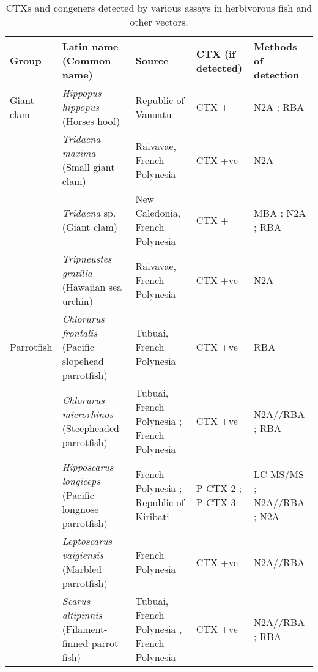 \documentclass[12pt]{article}
\begin{document}
\FloatBarrier
\begin{longtable}[l]{ | p{2cm} | p{3cm} | p{4.5cm} | p{2cm} | p{3cm} | }
	\caption{CTXs and congeners detected by various assays in herbivorous fish and other vectors.}\\
	\hline
	\label{tbl:HerbTable}
	\textbf{Group} & \textbf{Latin name} (Common name) & \textbf{Source} & \textbf{CTX (if detected)} & \textbf{Methods of detection} \\
	\hline
	Giant clam 	& \emph{Hippopus hippopus} (Horses hoof) & Republic of Vanuatu \cite{laurent2012ciguatera} & CTX +\cite{laurent2012ciguatera} & N2A \cite{laurent2012ciguatera}; RBA \cite{laurent2012ciguatera} \\
	& \emph{Tridacna maxima} (Small giant clam) & Raivavae, French Polynesia \cite{pawlowiez2013evaluation} & CTX +ve\cite{pawlowiez2013evaluation} & N2A \cite{pawlowiez2013evaluation} \\
	& \emph{Tridacna} sp. (Giant clam) & New Caledonia, French Polynesia \cite{laurent2012ciguatera} & CTX +\cite{laurent2012ciguatera} & MBA \cite{laurent2012ciguatera}; N2A \cite{laurent2012ciguatera}; RBA \cite{laurent2012ciguatera} \\
	& \emph{Tripneustes gratilla} (Hawaiian sea urchin) & Raivavae, French Polynesia \cite{pawlowiez2013evaluation} & CTX +ve\cite{pawlowiez2013evaluation} & N2A \cite{pawlowiez2013evaluation} \\
	\hline
	Parrotfish & \emph{Chlorurus frontalis} (Pacific slopehead parrotfish) & Tubuai, French Polynesia \cite{darius2007ciguatera} & CTX +ve \cite{darius2007ciguatera} & RBA \cite{darius2007ciguatera} \\
	& \emph{Chlorurus microrhinos} (Steepheaded parrotfish) & Tubuai, French Polynesia \cite{darius2007ciguatera}; French Polynesia \cite{chinain2014mail} & CTX +ve \cite{darius2007ciguatera,chinain2014mail} & N2A//RBA \cite{chinain2014mail}; RBA \cite{darius2007ciguatera} \\
	& \emph{Hipposcarus longiceps} (Pacific longnose parrotfish) & French Polynesia \cite{chinain2014mail}; Republic of Kiribati \cite{mak2013pacific} & P-CTX-2 \cite{mak2013pacific}; P-CTX-3 \cite{mak2013pacific} & LC-MS/MS \cite{mak2013pacific}; N2A//RBA \cite{chinain2014mail}; N2A \cite{mak2013pacific} \\
	& \emph{Leptoscarus vaigiensis} (Marbled parrotfish) & French Polynesia \cite{chinain2014mail} & CTX +ve \cite{chinain2014mail} & N2A//RBA \cite{chinain2014mail} \\
	& \emph{Scarus altipinnis} (Filament-finned parrot fish) & Tubuai, French Polynesia \cite{darius2007ciguatera}, French Polynesia \cite{chinain2014mail} & CTX +ve \cite{darius2007ciguatera,chinain2014mail} & N2A//RBA \cite{chinain2014mail}; RBA \cite{darius2007ciguatera} \\

\end{longtable}
\end{document}
